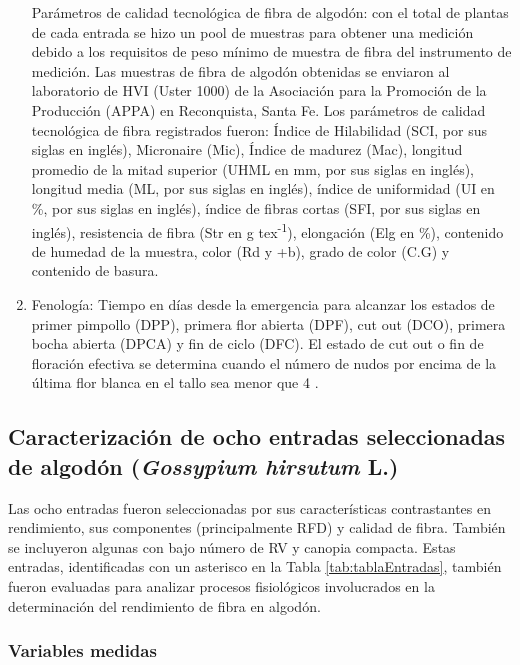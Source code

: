 \documentclass[12pt,oneside]{reedthesis}
\begin{document}
\begin{enumerate}
  Parámetros de calidad tecnológica de fibra de algodón: con el total de plantas de cada entrada se hizo un pool de muestras para obtener una medición debido a los requisitos de peso mínimo de muestra de fibra del instrumento de medición. Las muestras de fibra de algodón obtenidas se enviaron al laboratorio de HVI (Uster 1000) de la Asociación para la Promoción de la Producción (APPA) en Reconquista, Santa Fe. Los parámetros de calidad tecnológica de fibra registrados fueron: Índice de Hilabilidad (SCI, por sus siglas en inglés), Micronaire (Mic), Índice de madurez (Mac), longitud promedio de la mitad superior (UHML en mm, por sus siglas en inglés), longitud media (ML, por sus siglas en inglés), índice de uniformidad (UI en \%, por sus siglas en inglés), índice de fibras cortas (SFI, por sus siglas en inglés), resistencia de fibra (Str en g tex\textsuperscript{-1}), elongación (Elg en \%), contenido de humedad de la muestra, color (Rd y +b), grado de color (C.G) y contenido de basura.
\item
  Fenología: Tiempo en días desde la emergencia para alcanzar los estados de primer pimpollo (DPP), primera flor abierta (DPF), cut out (DCO), primera bocha abierta (DPCA) y fin de ciclo (DFC). El estado de cut out o fin de floración efectiva se determina cuando el número de nudos por encima de la última flor blanca en el tallo sea menor que 4 \autocite{bourland1992}.
\end{enumerate}

\subsection{\texorpdfstring{Caracterización de ocho entradas seleccionadas de algodón (\emph{Gossypium hirsutum} L.)}{Caracterización de ocho entradas seleccionadas de algodón (Gossypium hirsutum L.)}}\label{caracterizaciuxf3n-de-ocho-entradas-seleccionadas-de-algoduxf3n-gossypium-hirsutum-l.}

Las ocho entradas fueron seleccionadas por sus características contrastantes en rendimiento, sus componentes (principalmente RFD) y calidad de fibra. También se incluyeron algunas con bajo número de RV y canopia compacta. Estas entradas, identificadas con un asterisco en la Tabla \ref{tab:tablaEntradas}, también fueron evaluadas para analizar procesos fisiológicos involucrados en la determinación del rendimiento de fibra en algodón.

\subsubsection{Variables medidas}\label{variables-medidas-1}
\end{document}
